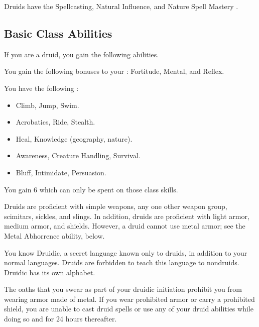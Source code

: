      Druids have the Spellcasting, Natural Influence, and Nature Spell Mastery .

    \subsection{Basic Class Abilities}
        If you are a druid, you gain the following abilities.

        You gain the following bonuses to your :  Fortitude,  Mental, and  Reflex.

        You have the following :
        \begin{itemize}
            \item {} Climb, Jump, Swim.
            \item {} Acrobatics, Ride, Stealth.
            \item {} Heal, Knowledge (geography, nature).
            \item {} Awareness, Creature Handling, Survival.
            \item {} Bluff, Intimidate, Persuasion.
        \end{itemize}
        You gain 6  which can only be spent on those class skills.

        Druids are proficient with simple weapons, any one other weapon group, scimitars, sickles, and slings.
        In addition, druids are proficient with light armor, medium armor, and shields.
        However, a druid cannot use metal armor; see the Metal Abhorrence ability, below.

        You know Druidic, a secret language known only to druids, in addition to your normal languages.
        Druids are forbidden to teach this language to nondruids.
        Druidic has its own alphabet.

        The oaths that you swear as part of your druidic initiation prohibit you from wearing armor made of metal.
        If you wear prohibited armor or carry a prohibited shield, you are unable to cast druid spells or use any of your  druid abilities while doing so and for 24 hours thereafter.

